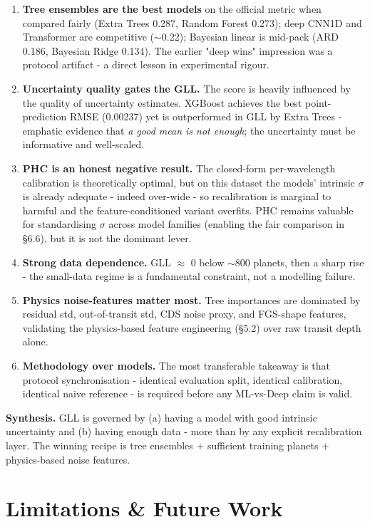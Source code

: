 \documentclass[12pt]{article}
\begin{document}
\begin{enumerate}
\item \textbf{Tree ensembles are the best models} on the official metric when compared fairly (Extra Trees 0.287, Random Forest 0.273); deep CNN1D and Transformer are competitive ($\sim$0.22); Bayesian linear is mid-pack (ARD 0.186, Bayesian Ridge 0.134). The earlier "deep wins" impression was a protocol artifact - a direct lesson in experimental rigour.
\item \textbf{Uncertainty quality gates the GLL.} The score is heavily influenced by the quality of uncertainty estimates. XGBoost achieves the best point-prediction RMSE (0.00237) yet is outperformed in GLL by Extra Trees - emphatic evidence that \emph{a good mean is not enough}; the uncertainty must be informative and well-scaled.
\item \textbf{PHC is an honest negative result.} The closed-form per-wavelength calibration is theoretically optimal, but on this dataset the models' intrinsic $\sigma$ is already adequate - indeed over-wide - so recalibration is marginal to harmful and the feature-conditioned variant overfits. PHC remains valuable for standardising $\sigma$ across model families (enabling the fair comparison in \S{}6.6), but it is not the dominant lever.
\item \textbf{Strong data dependence.} GLL $\approx$ 0 below $\sim$800 planets, then a sharp rise - the small-data regime is a fundamental constraint, not a modelling failure.
\item \textbf{Physics noise-features matter most.} Tree importances are dominated by residual std, out-of-transit std, CDS noise proxy, and FGS-shape features, validating the physics-based feature engineering (\S{}5.2) over raw transit depth alone.
\item \textbf{Methodology over models.} The most transferable takeaway is that protocol synchronisation - identical evaluation split, identical calibration, identical naive reference - is required before any ML-vs-Deep claim is valid.
\end{enumerate}

\textbf{Synthesis.} GLL is governed by (a) having a model with good intrinsic uncertainty and (b) having enough data - more than by any explicit recalibration layer. The winning recipe is tree ensembles $+$ sufficient training planets $+$ physics-based noise features.


\section{Limitations \& Future Work}
\end{document}
